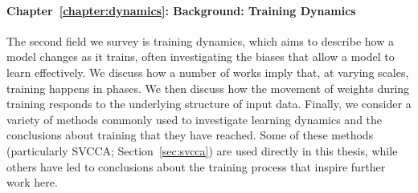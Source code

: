 \paragraph*{Chapter~\ref{chapter:dynamics}: Background: Training Dynamics} The second field we survey is training dynamics, which aims to describe how a model changes as it trains, often investigating the biases that allow a model to learn effectively. We discuss how a number of works imply that, at varying scales, training happens in phases. We then discuss how the movement of weights during training responds to the underlying structure of input data. Finally, we consider a variety of methods commonly used to investigate learning dynamics and the conclusions about training that they have reached. Some of these methods (particularly SVCCA; Section~\ref{sec:svcca}) are used directly in this thesis, while others have led to conclusions about the training process that inspire further work here.


